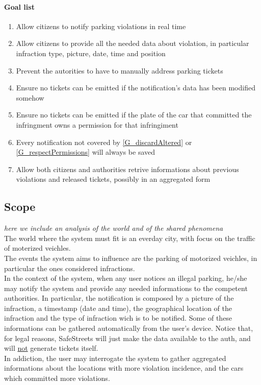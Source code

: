 \documentclass{article}
\newcommand{\enum}[1]{\texttt{#1.\arabic*}}
\begin{document}
		\paragraph{Goal list}
			\begin{enumerate}[label=\enum{G}]
				\item  \label{G_realTime}Allow citizens to notify parking violations in real time
				\item \label{G_allData}Allow citizens to provide all the needed data about violation, in particular infraction type, picture, date, time and position
				\item \label{G_helpAuth}Prevent the autorities to have to manually address parking tickets
				\item \label{G_discardAltered} Ensure no tickets can be emitted if the notification's data has been modified somehow
				\item \label{G_respectPermissions} Ensure no tickets can be emitted if the plate of the car that committed the infringment owns a permission for that infringiment
				\item \label{G_storeFine} Every notification not covered by \ref{G_discardAltered} or \ref{G_respectPermissions} will always be saved
				\item \label{G_statistics}Allow both citizens and authorities retrive informations about previous violations and released tickets, possibly in an aggregated form 
			\end{enumerate}

	\subsection{Scope} \textit{here we include an analysis of the world and of the shared phenomena}\\
	The world where the system must fit is an everday city, with focus on the traffic of moterized veichles.\\
	The events the system aims to influence are the parking of motorized veichles,  in particular the ones considered infractions.\\
	In the context of the system, when any user notices an illegal parking, he/she may notify the system and provide any needed informations to the competent authorities. In particular, the notification is composed by a picture of the infraction, a timestamp (date and time), the geographical location of the infraction and the type of infraction wich is to be notified. Some of these informations can be gathered automatically from the user's device. Notice that, for legal reasons, SafeStreets will just make the data available to the auth, and will \underline{not} generate tickets itself. \\
	In addiction, the user may interrogate the system to gather aggregated informations about the locations with more violation incidence, and the cars which committed more violations. 
	
\end{document}
